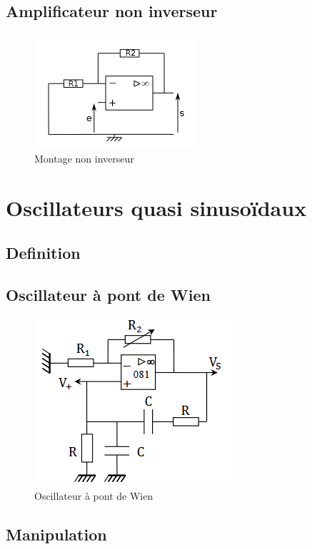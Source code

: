 \documentclass[10pt]{beamer}
\begin{document}
\subsection{Amplificateur non inverseur}

\begin{frame}{\insertsubsection}
    \begin{figure}
        \centering
        \includegraphics[width=.7\textwidth]{Noninverseur.png}
        \caption{Montage non inverseur}
    \end{figure}
\end{frame}

\section{Oscillateurs quasi sinusoïdaux}
\subsection{Definition}
\subsection{Oscillateur à pont de Wien}

\begin{frame}{\insertsubsection}
    \begin{figure}
        \centering
        \includegraphics[width=.7\textwidth]{PontDeWien.png}
        \caption{Oscillateur à pont de Wien}
    \end{figure}
\end{frame}

\subsection{Manipulation}
\end{document}
